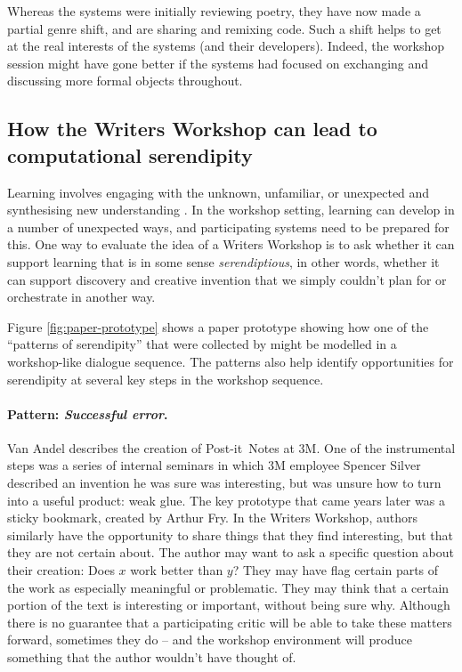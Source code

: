 Whereas the systems were initially reviewing poetry, they have now
made a partial genre shift, and are sharing and remixing code.  Such a
shift helps to get at the real interests of the systems (and their
developers).  Indeed, the workshop session might have gone better if
the systems had focused on exchanging and discussing more formal
objects throughout.


\subsection{How the Writers Workshop can lead to computational serendipity}

Learning involves engaging with the unknown, unfamiliar, or unexpected
and synthesising new understanding \cite{deleuze1994difference}.  In
the workshop setting, learning can develop in a number of unexpected
ways, and participating systems need to be prepared for this.  One way
to evaluate the idea of a Writers Workshop is to ask whether it can
support learning that is in some sense \emph{serendiptious}, in other
words, whether it can support discovery and creative invention that we
simply couldn't plan for or orchestrate in another way.

Figure \ref{fig:paper-prototype} shows a paper prototype showing how
one of the ``patterns of serendipity'' that were collected by
 might be modelled in a workshop-like dialogue sequence.
The patterns also help identify opportunities for serendipity at
several key steps in the workshop sequence.

\paragraph{Pattern: \emph{Successful error}.}  Van Andel describes the
creation of Post-it\texttrademark\ Notes at 3M.  One of the
instrumental steps was a series of internal seminars in which 3M
employee Spencer Silver described an invention he was sure was
interesting, but was unsure how to turn into a useful product: weak
glue.  The key prototype that came years later was a sticky bookmark,
created by Arthur Fry.  In the Writers Workshop, authors similarly
have the opportunity to share things that they find interesting, but
that they are not certain about.  The author may want to ask a
specific question about their creation: Does $x$ work better than $y$?
They may have flag certain parts of the work as especially meaningful
or problematic.  They may think that a certain portion of the text is
interesting or important, without being sure why.  Although there is
no guarantee that a participating critic will be able to take these
matters forward, sometimes they do -- and the workshop environment
will produce something that the author wouldn't have thought of.

